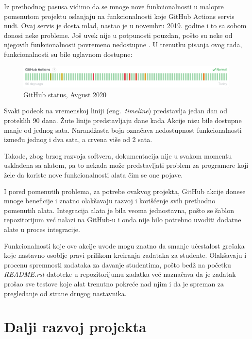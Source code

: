 \documentclass[12pt]{report}
\begin{document}
Iz prethodnog pasusa vidimo da se mnoge nove funkcionalnosti u malopre pomenutom projektu oslanjaju na funkcionalnosti koje GitHub Actions servis nudi. Ovaj servis je dosta mlad, nastao je u novembru 2019. godine i to sa sobom donosi neke probleme. Još uvek nije u potpunosti pouzdan, pošto su neke od njegovih funkcionalnosti povremeno nedostupne \cite{status}. U trenutku pisanja ovog rada, funkcionalnosti su bile uglavnom dostupne:

\begin{figure}[H]
    \centering
    \includegraphics[width=\linewidth]{images/status.png}
    \caption{GitHub status, Avgust 2020}
\end{figure}

Svaki podeok na vremenskoj liniji (eng.\ \textit{timeline}) predstavlja jedan dan od proteklih 90 dana. Žute linije predstavljaju dane kada Akcije nisu bile dostupne manje od jednog sata. Narandžasta boja označava nedostupnost funkcionalnosti između jednog i dva sata, a crvena više od 2 sata.

Takođe, zbog brzog razvoja softvera, dokumentacija nije u svakom momentu usklađena sa alatom, pa to nekada može predstavljati problem za programere koji žele da koriste nove funkcionalnosti alata čim se one pojave.

I pored pomenutih problema, za potrebe ovakvog projekta, GitHub akcije donese mnoge beneficije i znatno olakšavaju razvoj i korišćenje svih prethodno pomenutih alata. Integracija alata je bila veoma jednostavna, pošto se šablon repozitorijum već nalazi na GitHub-u i onda nije bilo potrebno uvoditi dodatne alate u proces integracije.

Funkcionalnosti koje ove akcije uvode mogu znatno da smanje učestalost grešaka koje nastavno osoblje pravi prilikom kreiranja zadataka za studente. Olakšavaju i procenu spremnosti zadataka za davanje studentima, pošto bedž na početku \textit{README.rst} datoteke u repozitorijumu zadatka već naznačava da je zadatak prošao sve testove koje alat trenutno pokreće nad njim i da je spreman za pregledanje od strane drugog nastavnika.

\section{Dalji razvoj projekta}
\end{document}
